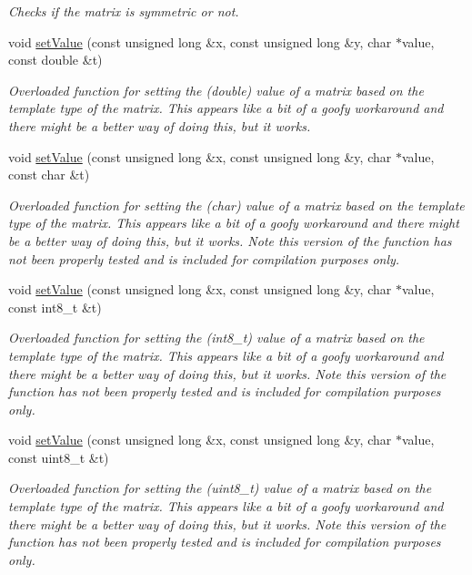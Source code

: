 \begin{DoxyCompactItemize}
\begin{DoxyCompactList}\small\item\em Checks if the matrix is symmetric or not. \end{DoxyCompactList}\item 
void \hyperlink{class_matrix_a93ee02612d3a28747bdbe7667e3c3f29}{set\+Value} (const unsigned long \&x, const unsigned long \&y, char $\ast$value, const double \&t)
\begin{DoxyCompactList}\small\item\em Overloaded function for setting the (double) value of a matrix based on the template type of the matrix. This appears like a bit of a goofy workaround and there might be a better way of doing this, but it works. \end{DoxyCompactList}\item 
void \hyperlink{class_matrix_ac742681e44a0b08c105ce7c16047ee20}{set\+Value} (const unsigned long \&x, const unsigned long \&y, char $\ast$value, const char \&t)
\begin{DoxyCompactList}\small\item\em Overloaded function for setting the (char) value of a matrix based on the template type of the matrix. This appears like a bit of a goofy workaround and there might be a better way of doing this, but it works. Note this version of the function has not been properly tested and is included for compilation purposes only. \end{DoxyCompactList}\item 
void \hyperlink{class_matrix_ad9c05b3b70a1d2cbde0da69d9c509b28}{set\+Value} (const unsigned long \&x, const unsigned long \&y, char $\ast$value, const int8\+\_\+t \&t)
\begin{DoxyCompactList}\small\item\em Overloaded function for setting the (int8\+\_\+t) value of a matrix based on the template type of the matrix. This appears like a bit of a goofy workaround and there might be a better way of doing this, but it works. Note this version of the function has not been properly tested and is included for compilation purposes only. \end{DoxyCompactList}\item 
void \hyperlink{class_matrix_a8e6de70fe02f240a62ec9cc1fd81dcc6}{set\+Value} (const unsigned long \&x, const unsigned long \&y, char $\ast$value, const uint8\+\_\+t \&t)
\begin{DoxyCompactList}\small\item\em Overloaded function for setting the (uint8\+\_\+t) value of a matrix based on the template type of the matrix. This appears like a bit of a goofy workaround and there might be a better way of doing this, but it works. Note this version of the function has not been properly tested and is included for compilation purposes only. \end{DoxyCompactList}\item 

\end{DoxyCompactItemize}

